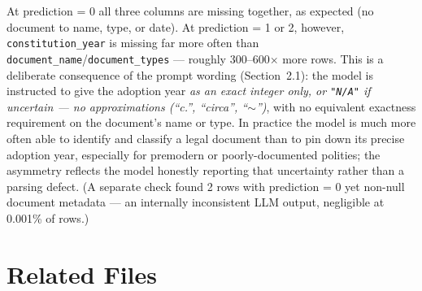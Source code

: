 \documentclass[11pt, a4paper]{article}
\begin{document}
At prediction = 0 all three columns are missing together, as expected (no document to name, type,
or date). At prediction = 1 or 2, however, \texttt{constitution\_\allowbreak year} is missing far
more often than \texttt{document\_\allowbreak name}/\texttt{document\_\allowbreak types} ---
roughly 300--600$\times$ more rows. This is a deliberate consequence of the prompt wording
(Section~2.1): the model is instructed to give the adoption year \emph{as an exact integer only,
or \texttt{"N/A"} if uncertain --- no approximations (``c.'', ``circa'', ``$\sim$'')}, with no
equivalent exactness requirement on the document's name or type. In practice the model is much
more often able to identify and classify a legal document than to pin down its precise adoption
year, especially for premodern or poorly-documented polities; the asymmetry reflects the model
honestly reporting that uncertainty rather than a parsing defect. (A separate check found 2 rows
with prediction = 0 yet non-null document metadata --- an internally inconsistent LLM output,
negligible at 0.001\% of rows.)

\section{Related Files}

\end{document}
